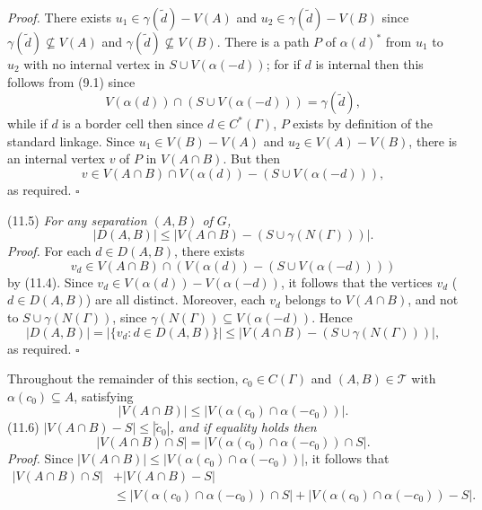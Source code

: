\textit{Proof.} There exists $u_1 \in \gamma(\tilde{d}) - V(A)$ and $u_2 \in \gamma(\tilde{d}) - V(B)$ since $\gamma(\tilde{d}) \not\subseteq V(A)$ and $\gamma(\tilde{d}) \not\subseteq V(B)$. There is a path $P$ of $\alpha(d)^*$ from $u_1$ to $u_2$ with no internal vertex in $S \cup V(\alpha(-d))$; for if $d$ is internal then this follows from (9.1) since
\begin{equation*}
V(\alpha(d)) \cap (S \cup V(\alpha(-d))) = \gamma(\tilde{d}),
\end{equation*}
while if $d$ is a border cell then since $d \in C^*(\Gamma)$, $P$ exists by definition of the standard linkage. Since $u_1 \in V(B) - V(A)$ and $u_2 \in V(A) - V(B)$, there is an internal vertex $v$ of $P$ in $V(A \cap B)$. But then
\begin{equation*}
v \in V(A \cap B) \cap V(\alpha(d)) - (S \cup V(\alpha(-d))),
\end{equation*}
as required. $\square$

\stmt
(11.5) \textit{For any separation $(A, B)$ of $G$,}
\begin{equation*}
|D(A, B)| \le |V(A \cap B) - (S \cup \gamma(N(\Gamma)))|.
\end{equation*}
\textit{Proof.} For each $d \in D(A, B)$, there exists
\begin{equation*}
v_d \in V(A \cap B) \cap (V(\alpha(d)) - (S \cup V(\alpha(-d))))
\end{equation*}
by (11.4). Since $v_d \in V(\alpha(d)) - V(\alpha(-d))$, it follows that the vertices $v_d$ ($d \in D(A, B)$) are all distinct. Moreover, each $v_d$ belongs to $V(A \cap B)$, and not to $S \cup \gamma(N(\Gamma))$, since $\gamma(N(\Gamma)) \subseteq V(\alpha(-d))$. Hence
\begin{equation*}
|D(A, B)| = |\{v_d \colon d \in D(A, B)\}| \le |V(A \cap B) - (S \cup \gamma(N(\Gamma)))|,
\end{equation*}
as required. $\square$

Throughout the remainder of this section, $c_0 \in C(\Gamma)$ and $(A, B) \in \mathscr{T}$ with $\alpha(c_0) \subseteq A$, satisfying
\begin{equation*}
|V(A \cap B)| \le |V(\alpha(c_0) \cap \alpha(-c_0))|.
\end{equation*}
\stmt
(11.6) \textit{$|V(A \cap B) - S| \le |\tilde{c}_0|$, and if equality holds then}
\begin{equation*}
|V(A \cap B) \cap S| = |V(\alpha(c_0) \cap \alpha(-c_0)) \cap S|.
\end{equation*}
\textit{Proof.} Since $|V(A \cap B)| \le |V(\alpha(c_0) \cap \alpha(-c_0))|$, it follows that
\begin{align*}
|V(A \cap B) \cap S| &+ |V(A \cap B) - S| \\
&\le |V(\alpha(c_0) \cap \alpha(-c_0)) \cap S| + |V(\alpha(c_0) \cap \alpha(-c_0)) - S|.
\end{align*}
